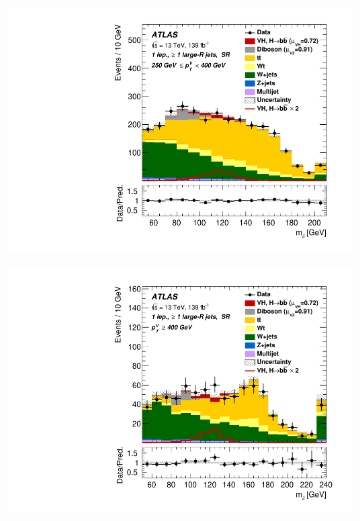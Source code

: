 \begin{figure}[!htbp]
\begin{subfigure}{.4\textwidth}
  \end{subfigure}
  \begin{subfigure}{.4\textwidth}
    \includegraphics[width=\textwidth]{chapters/6.vhbb_boosted/figs/Region_BMin250_BMax400_incFat1_Fat1_Y6051_DSRnoaddbjetsr_T2_L1_distmBB_GlobalFit_unconditionnal_mu1.pdf}
  \end{subfigure}%
  \begin{subfigure}{.4\textwidth}
    \includegraphics[width=\textwidth]{chapters/6.vhbb_boosted/figs/Region_BMin400_incFat1_Fat1_Y6051_DSRnoaddbjetsr_T2_L1_distmBB_GlobalFit_unconditionnal_mu1.pdf}
  \end{subfigure}
  \begin{subfigure}{.4\textwidth}

\end{subfigure}
\end{figure}
